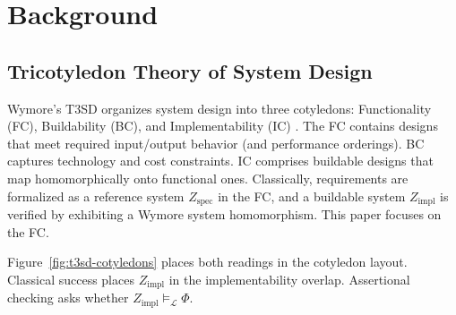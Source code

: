 \section{Background} \label{sec:background}

\subsection{Tricotyledon Theory of System Design}
Wymore's T3SD organizes system design into three cotyledons: Functionality (FC), Buildability (BC), and Implementability (IC) \citep{Wymore1993}. The FC contains designs that meet required input/output behavior (and performance orderings). BC captures technology and cost constraints. IC comprises buildable designs that map homomorphically onto functional ones. Classically, requirements are formalized as a reference system $Z_{\text{spec}}$ in the FC, and a buildable system $Z_{\text{impl}}$ is verified by exhibiting a Wymore system homomorphism. This paper focuses on the FC.

Figure~\ref{fig:t3sd-cotyledons} places both readings in the cotyledon layout. Classical success places $Z_{\text{impl}}$ in the implementability overlap. Assertional checking asks whether $Z_{\text{impl}} \models_{\mathcal{L}} \Phi$.

